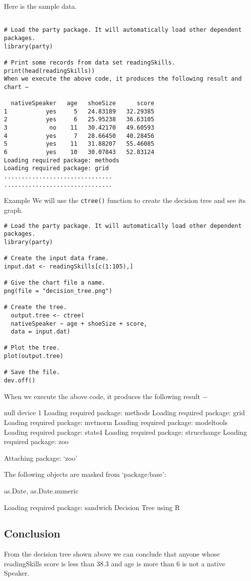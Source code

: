 \documentclass[a4paper,12pt]{article}
\begin{document}
Here is the sample data.
\begin{verbatim}
    
# Load the party package. It will automatically load other dependent packages.
library(party)

# Print some records from data set readingSkills.
print(head(readingSkills))
When we execute the above code, it produces the following result and chart −

  nativeSpeaker   age   shoeSize      score
1           yes     5   24.83189   32.29385
2           yes     6   25.95238   36.63105
3            no    11   30.42170   49.60593
4           yes     7   28.66450   40.28456
5           yes    11   31.88207   55.46085
6           yes    10   30.07843   52.83124
Loading required package: methods
Loading required package: grid
...............................
...............................
\end{verbatim}

Example
We will use the \texttt{ctree()} function to create the decision tree and see its graph.

\begin{verbatim}
# Load the party package. It will automatically load other dependent packages.
library(party)

# Create the input data frame.
input.dat <- readingSkills[c(1:105),]

# Give the chart file a name.
png(file = "decision_tree.png")

# Create the tree.
  output.tree <- ctree(
  nativeSpeaker ~ age + shoeSize + score, 
  data = input.dat)

# Plot the tree.
plot(output.tree)

# Save the file.
dev.off()
\end{verbatim}

When we execute the above code, it produces the following result −

null device 
          1 
Loading required package: methods
Loading required package: grid
Loading required package: mvtnorm
Loading required package: modeltools
Loading required package: stats4
Loading required package: strucchange
Loading required package: zoo

Attaching package: ‘zoo’

The following objects are masked from ‘package:base’:

    as.Date, as.Date.numeric

Loading required package: sandwich
Decision Tree using R

\subsection*{Conclusion}

From the decision tree shown above we can conclude that anyone whose readingSkills score is less than 38.3 and age is more than 6 is not a native Speaker.
\end{document}
